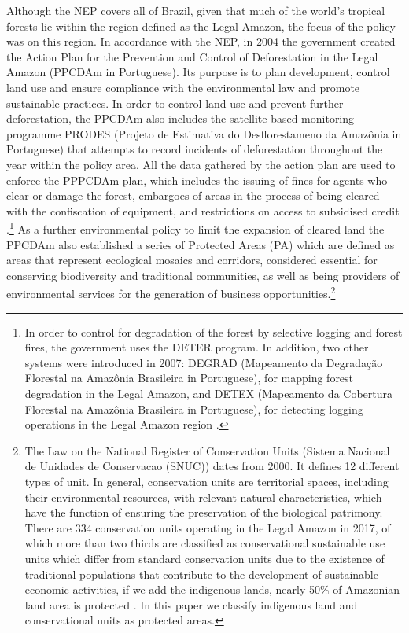 Although the NEP covers all of Brazil, given that much of the world's tropical forests lie within the region defined as the Legal Amazon, the focus of the policy was on this region. In accordance with the NEP, in 2004 the government created the Action Plan for the Prevention and Control of Deforestation in the Legal Amazon (PPCDAm in Portuguese). Its purpose is to plan development, control land use and ensure compliance with the environmental law and promote sustainable practices. In order to control land use and prevent further deforestation, the PPCDAm  also includes the satellite-based monitoring programme PRODES (Projeto de Estimativa do Desflorestameno da Amaz\^{o}nia in Portuguese) \citep{inpe} that attempts to record incidents of deforestation throughout the year within the policy area. All the data gathered by the action plan are used to enforce the PPPCDAm plan, which includes the issuing of fines for agents who clear or damage the forest, embargoes of areas in the process of being cleared with the confiscation of equipment, and restrictions on access to subsidised credit \citep{AUBERTIN}.\footnote{In order to control for degradation of the forest by selective logging and forest fires, the government uses the DETER program. In addition, two other systems were introduced in 2007: DEGRAD (Mapeamento da Degradaç\~{a}o Florestal na Amaz\^{o}nia Brasileira in Portuguese), for mapping forest degradation in the Legal Amazon, and DETEX (Mapeamento da Cobertura Florestal na Amaz\^{o}nia Brasileira in Portuguese), for detecting logging operations in the Legal Amazon region \citep{VALERIANO}.} As a further environmental policy to limit the expansion of cleared land the PPCDAm also established a series of Protected Areas (PA) which are defined as areas that represent ecological mosaics and corridors, considered essential for conserving biodiversity and traditional communities, as well as being providers of environmental services for the generation of business opportunities.\footnote{The Law on the National Register of Conservation Units (Sistema Nacional de Unidades de Conservacao (SNUC)) dates from 2000. It defines 12 different types of unit. In general, conservation units are territorial spaces, including their environmental resources, with relevant natural characteristics, which have the function of ensuring the preservation of the biological patrimony. There are 334 conservation units operating in the Legal Amazon in 2017, of which more than two thirds are classified as conservational sustainable use units which differ from standard conservation units due to the existence of traditional populations that contribute to the development of sustainable economic activities, if we add the indigenous lands, nearly 50\% of Amazonian land area is protected \citep{AUBERTIN,MMA,MMA2017}. In this paper we classify indigenous land and conservational units as protected areas.}

